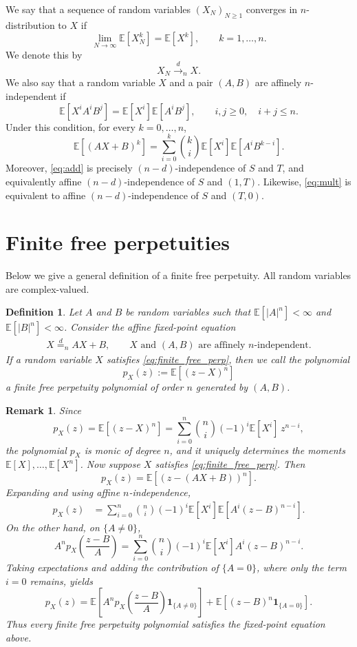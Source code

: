 \documentclass[a4paper,11pt]{amsart}
\numberwithin{equation}{section}
\newtheorem{remark}[theorem]{Remark}
\newtheorem{definition}[theorem]{Definition}
\newcommand{\E}{\mathbb{E}}
\begin{document}
We say that a sequence of random variables \((X_N)_{N\ge1}\) converges in \(n\)-distribution to \(X\) if
\[
\lim_{N\to\infty}\E[X_N^k]=\E[X^k],
\qquad k=1,\dots,n.
\]
We denote this by
\[
X_N \xrightarrow{d}_n X.
\]
We also say that a random variable \(X\) and a pair \((A,B)\) are affinely \(n\)-independent if
\[
\E[X^iA^iB^j]=\E[X^i]\E[A^iB^j],
\qquad i,j\ge 0,\quad i+j\le n.
\]
Under this condition, for every \(k=0,\dots,n\),
\[
\E[(AX+B)^k]
=
\sum_{i=0}^k \binom{k}{i}\E[X^i]\E[A^iB^{k-i}].
\]
Moreover, \eqref{eq:add} is precisely \((n-d)\)-independence of \(S\) and \(T\), and equivalently affine \((n-d)\)-independence of \(S\) and \((1,T)\). Likewise, \eqref{eq:mult} is equivalent to affine \((n-d)\)-independence of \(S\) and \((T,0)\).

\section{Finite free perpetuities}\label{sec:ffp}



Below we give a general definition of a finite free perpetuity. All random variables are complex-valued.

\begin{definition}\label{def:finite_free_perp}
  Let \(A\) and \(B\) be random variables such that
\(\E[|A|^{n}]<\infty\) and \(\E[|B|^{n}]<\infty\).
Consider the affine fixed-point equation
\begin{align}\label{eq:finite_free_perp}
X\stackrel{d}{=}_n AX+B,
\qquad
X \text{ and } (A,B) \text{ are affinely \(n\)-independent}.
\end{align}
If a random variable \(X\) satisfies \eqref{eq:finite_free_perp}, then we call the polynomial
\[
p_X(z):=\E[(z-X)^n]
\]
a finite free perpetuity polynomial of order \(n\) generated by \((A,B)\).
\end{definition}


\begin{remark}
Since
\[
p_X(z)=\E[(z-X)^n]
=\sum_{i=0}^n \binom{n}{i}(-1)^i \E[X^i]\,z^{n-i},
\]
the polynomial \(p_X\) is monic of degree \(n\), and it uniquely determines the moments
\(\E[X],\ldots,\E[X^n]\).
Now suppose \(X\) satisfies \eqref{eq:finite_free_perp}. Then
\[
p_X(z)=\E[(z-(AX+B))^n].
\]
Expanding and using affine \(n\)-independence,
\begin{align*}
p_X(z)
&=\sum_{i=0}^n \binom{n}{i}(-1)^i \E[X^i]\E\!\left[A^i(z-B)^{n-i}\right].
\end{align*}
On the other hand, on \(\{A\neq0\}\),
\[
A^n p_X\!\left(\frac{z-B}{A}\right)
=\sum_{i=0}^n \binom{n}{i}(-1)^i \E[X^i]A^i(z-B)^{n-i}.
\]
Taking expectations and adding the contribution of \(\{A=0\}\), where only the term \(i=0\) remains, yields
\[
p_X(z)
=
\E\left[A^n p_X\!\left(\frac{z-B}{A}\right)\mathbf 1_{\{A\neq0\}}\right]
+\E\left[(z-B)^n\mathbf 1_{\{A=0\}}\right].
\]
Thus every finite free perpetuity polynomial satisfies the fixed-point equation above. 
\end{remark}
\end{document}
